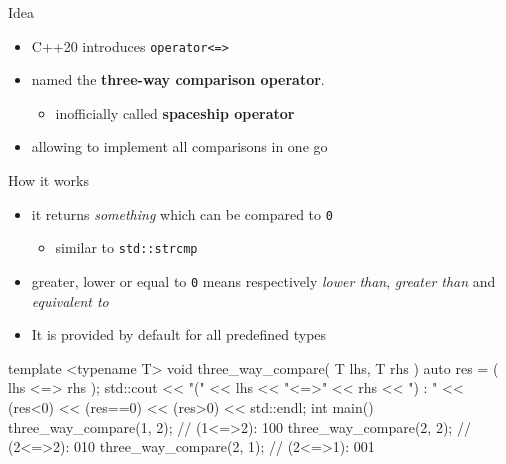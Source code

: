 \begin{frame}[fragile]
  \begin{block}{Idea}
    \begin{itemize}
    \item C++20 introduces \texttt{operator<=>}
    \item named the \textbf{three-way comparison operator}.
      \begin{itemize}
      \item inofficially called \textbf{spaceship operator}
      \end{itemize}
    \item allowing to implement all comparisons in one go
    \end{itemize}
  \end{block}
  \begin{exampleblock}{How it works}
    \begin{itemize}
    \item it returns \emph{something} which can be compared to \texttt{0}
      \begin{itemize}
      \item similar to \texttt{std::strcmp}
      \end{itemize}
    \item greater, lower or equal to \texttt{0} means respectively \emph{lower than}, \emph{greater than} and \emph{equivalent to}
    \item It is provided by default for all predefined types
    \end{itemize}
  \end{exampleblock}
\end{frame}

\begin{frame}[fragile]
  \begin{exampleblock}{}
    \begin{cppcode*}{}
    template <typename T>
    void three_way_compare( T lhs, T rhs ) {
      auto res = ( lhs <=> rhs );
      std::cout << "(" << lhs << "<=>" << rhs << ") : "
                << (res<0) << (res==0) << (res>0)
                << std::endl;
    }
    int main() {
      three_way_compare(1, 2); // (1<=>2): 100
      three_way_compare(2, 2); // (2<=>2): 010
      three_way_compare(2, 1); // (2<=>1): 001
    }
    \end{cppcode*}
  \end{exampleblock}
\end{frame}

